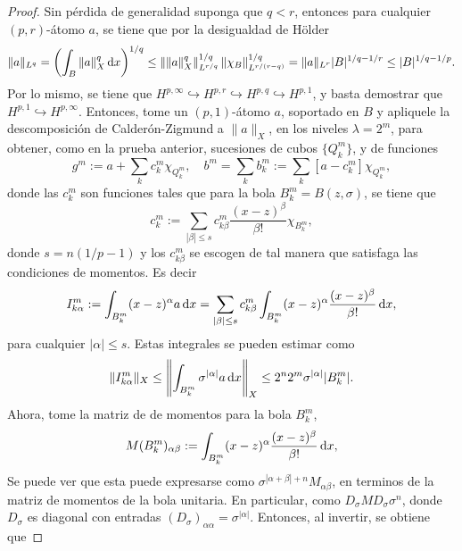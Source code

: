 \begin{proof}
	Sin pérdida de generalidad suponga que $q<r$, entonces para cualquier $(p,r)$-átomo $a$, se tiene que por la desigualdad de Hölder
	\begin{equation*}
		\|a\|_{L^q}=\left(\int_B \|a\|_X^q \mathop{}\!\mathrm{d} x\right)^{1/q} \leq \left\|\|a\|_X^q\right\|_{L^{r/q}}^{1/q} \|\chi_B\|_{L^{r/(r-q)}}^{1/q} = \|a\|_{L^r} |B|^{1/q-1/r} \leq |B|^{1/q-1/p}. 
	\end{equation*}
	Por lo mismo, se tiene que $H^{p,\infty}\hookrightarrow H^{p,r}\hookrightarrow H^{p,q}\hookrightarrow H^{p,1}$, y basta demostrar que $H^{p,1}\hookrightarrow H^{p,\infty}$. Entonces, tome un $(p,1)$-átomo $a$, soportado en $B$ y apliquele la descomposición de Calderón-Zigmund a $\|a\|_X$, en los niveles $\lambda=2^m$, para obtener, como en la prueba anterior, sucesiones de cubos $\{Q_k^m\}$, y de funciones
	\begin{equation*}
		g^m := a + \sum_k c^m_k\chi_{Q_k^m}, \quad b^m = \sum_k b_k^m := \sum_k [a-c_k^m]\chi_{Q_k^m},
	\end{equation*}
	 donde las $c_k^m$ son funciones tales que para la bola $B_k^m = B(z, \sigma)$, se tiene que
	\begin{equation*}
		c_k^m := \sum_{|\beta|\leq s} c_{k\beta}^m \frac{(x-z)^\beta}{\beta!}\chi_{B_k^m},
	\end{equation*}
	donde $s=n(1/p-1)$ y los $c_{k\beta}^m$ se escogen de tal manera que satisfaga las condiciones de momentos. Es decir 
	\begin{equation*}
		I_{k\alpha}^m := \int_{B_k^m} (x-z)^\alpha a \mathop{}\!\mathrm{d} x = \sum_{|\beta|\leq s} c_{k\beta}^m\int_{B_k^m} (x-z)^\alpha \frac{(x-z)^\beta}{\beta!} \mathop{}\!\mathrm{d} x,
	\end{equation*}
	para cualquier $|\alpha|\leq s$. Estas integrales se pueden estimar como
	\begin{equation*}
		\|I_{k\alpha}^m\|_X \leq  \left\|\int_{B_k^m} \sigma^{|\alpha|} a \mathop{}\!\mathrm{d} x\right\|_X \leq 2^n 2^m \sigma^{|\alpha|}|{B_k^m}|.
	\end{equation*}
	Ahora, tome la matriz de de momentos para la bola $B_k^m$,
	\begin{equation*}
		M({B_k^m})_{\alpha\beta} := \int_{B_k^m} (x-z)^\alpha \frac{(x-z)^\beta}{\beta!} \mathop{}\!\mathrm{d} x,
	\end{equation*}
	Se puede ver que esta puede expresarse como $\sigma^{|\alpha+\beta|+n}M_{\alpha\beta}$, en terminos de la matriz de momentos de la bola unitaria. En particular, como $D_\sigma MD_\sigma \sigma^{n}$, donde $D_\sigma$ es diagonal con entradas $(D_\sigma)_{\alpha\alpha} = \sigma^{|\alpha|}$. Entonces, al invertir, se obtiene que 

\end{proof}
